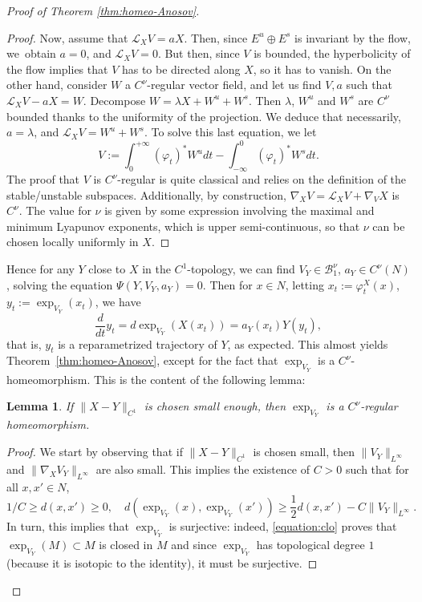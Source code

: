 \documentclass[JEP,XML,SOM,Unicode,NoFloatCountersInSection]{cedram}
\theoremstyle{plain}
\newtheorem{lemma}{Lemma}[section]
\theoremstyle{definition}
\begin{document}
\begin{proof}[Proof of Theorem \ref{thm:homeo-Anosov}]
\begin{proof}
Now, assume that $\mathcal{L}_X V = a X$. Then, since $E^u\oplus E^s$ is invariant by the flow, we~obtain $a=0$, and $\mathcal{L}_X V = 0$. But then, since $V$ is bounded, the hyperbolicity of the flow implies that $V$ has to be directed along $X$, so it has to vanish. On the other hand, consider $W$ a $C^\nu$-regular vector field, and let us find $V,a$ such that $\mathcal{L}_X V - aX = W$. Decompose $W = \lambda X + W^u + W^s$. Then $\lambda$, $W^u$ and $W^s$ are $C^\nu$ bounded thanks to the uniformity of the projection. We deduce that necessarily, $a = \lambda$, and $\mathcal{L}_X V= W^u + W^s$. To solve this last equation, we let
\[
V := \int_0^{+\infty}(\varphi_t)^\ast W^u dt -\int_{-\infty}^0 (\varphi_t)^\ast W^s dt.
\]
The proof that $V$ is $C^\nu$-regular is quite classical and relies on the definition of the stable/unstable subspaces. Additionally, by construction, $\nabla_X V = \mathcal{L}_X V + \nabla_V X$ is~$C^\nu$. The value for $\nu$ is given by some expression involving the maximal and minimum Lyapunov exponents, which is upper semi-continuous, so that $\nu$ can be chosen locally uniformly in $X$.
\end{proof}

Hence for any $Y$ close to $X$ in the $C^1$-topology, we can find $V_Y \in \mathcal{B}_1^\nu$, $a_Y \in C^\nu(N)$, solving the equation $\Psi(Y,V_Y, a_Y) = 0$. Then for $x\in N$, letting $x_t := \varphi_t^X(x)$, $y_t := \exp_{V_Y}(x_t)$, we have
\[
\frac{d}{dt}y_t = d \exp_{V_Y}(X (x_t)) = a_Y(x_t) Y(y_t),
\]
that is, $y_t$ is a reparametrized trajectory of $Y$, as expected. This almost yields Theorem~\ref{thm:homeo-Anosov}, except for the fact that $\exp_{V_Y}$ is a $C^\nu$-homeomorphism. This is the content of the following lemma:

\begin{lemma}
\label{lemma:hom}
If $\|X-Y\|_{C^1}$ is chosen small enough, then $\exp_{V_Y}$ is a $C^\nu$-regular homeomorphism.
\end{lemma}

\begin{proof}
We start by observing that if $\|X-Y\|_{C^1}$ is chosen small, then $\|V_Y\|_{L^\infty}$ and $\|\nabla_X V_Y\|_{L^\infty}$ are also small. This implies the existence of $C > 0$ such that for all $x,x' \in N$,
\begin{equation}
\label{equation:clo}
1/C \geq d(x,x')\geq 0,\quad d(\exp_{V_Y}(x), \exp_{V_Y}(x')) \geq \frac{1}{2} d(x,x') - C\|V_Y\|_{L^\infty}.
\end{equation}
In turn, this implies that $\exp_{V_Y}$ is surjective: indeed, \eqref{equation:clo} proves that $\exp_{V_Y}(M) \subset M$ is closed in $M$ and since $\exp_{V_Y}$ has topological degree $1$ (because it is isotopic to the identity), it must be surjective.


\end{proof}
\end{proof}
\end{document}
